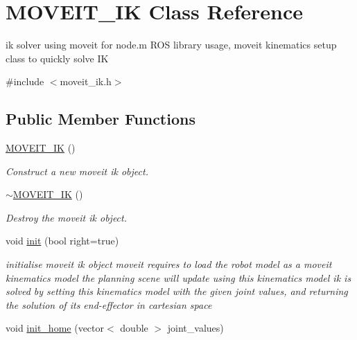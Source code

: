 \hypertarget{classMOVEIT__IK}{}\section{M\+O\+V\+E\+I\+T\+\_\+\+IK Class Reference}
\label{classMOVEIT__IK}


ik solver using moveit for node.\+m R\+OS library usage, moveit kinematics setup class to quickly solve IK  




{\ttfamily \#include $<$moveit\+\_\+ik.\+h$>$}

\subsection*{Public Member Functions}
\begin{DoxyCompactItemize}
\item 
\mbox{\label{classMOVEIT__IK_a8f6dd02b0c1c1c4528552fdcdb8af1e1}} 
\hyperlink{classMOVEIT__IK_a8f6dd02b0c1c1c4528552fdcdb8af1e1}{M\+O\+V\+E\+I\+T\+\_\+\+IK} ()
\begin{DoxyCompactList}\small\item\em Construct a new moveit ik object. \end{DoxyCompactList}\item 
\mbox{\label{classMOVEIT__IK_aff4d253c101968b8e756e9f179270109}} 
\hyperlink{classMOVEIT__IK_aff4d253c101968b8e756e9f179270109}{$\sim$\+M\+O\+V\+E\+I\+T\+\_\+\+IK} ()
\begin{DoxyCompactList}\small\item\em Destroy the moveit ik object. \end{DoxyCompactList}\item 
void \hyperlink{classMOVEIT__IK_a93f8e535f8fbbe54100d8eecdd2ee6e4}{init} (bool right=true)
\begin{DoxyCompactList}\small\item\em initialise moveit ik object moveit requires to load the robot model as a moveit kinematics model the planning scene will update using this kinematics model ik is solved by setting this kinematics model with the given joint values, and returning the solution of its end-\/effector in cartesian space \end{DoxyCompactList}\item 
void \hyperlink{classMOVEIT__IK_af5b81c18b576ae1371ddc866061df1d5}{init\+\_\+home} (vector$<$ double $>$ joint\+\_\+values)

\end{DoxyCompactItemize}
